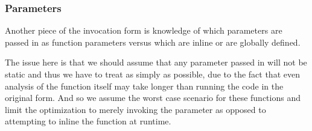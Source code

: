 \subsubsection{Parameters}
Another piece of the invocation form is knowledge of which parameters are passed in as function parameters versus which are inline or are globally defined.

The issue here is that we should assume that any parameter passed in will not be static and thus we have to treat as simply as possible, due to the fact that even analysis of the function itself may take longer than running the code in the original form.  And so we assume the worst case scenario for these functions and limit the optimization to merely invoking the parameter as opposed to attempting to inline the function at runtime.